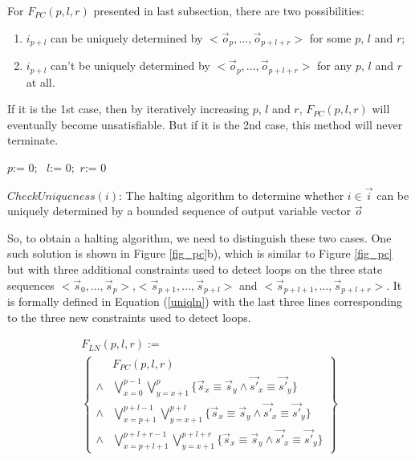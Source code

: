 \documentclass[twocolumn]{article}
\begin{document}
For $F_{PC}(p,l,r)$ presented in last subsection,
there are two possibilities:
\begin{enumerate}
 \item 
$i_{p+l}$ can be uniquely determined by $<\vec{o}_{p},\dots,\vec{o}_{p+l+r}>$ for some $p$, $l$ and $r$;
 \item 
$i_{p+l}$ can't be uniquely determined by $<\vec{o}_{p},\dots,\vec{o}_{p+l+r}>$ for any $p$, $l$ and $r$ at all.
\end{enumerate}

If it is the 1st case,
then by iteratively increasing  $p$, $l$ and $r$,
$F_{PC}(p,l,r)$ will eventually become unsatisfiable.
But if it is the 2nd case,
this method will never terminate.

\begin{algorithm}[t]
\SetAlgoVlined
{}
$p$:= 0; ~$l$:= 0;~$r$:= 0\;
\caption{$CheckUniqueness(i)$: The halting algorithm to determine 
whether $i\in\vec{i}$ can be uniquely determined by a bounded sequence of output variable vector $\vec{o}$}
\label{alg_pcln}
\end{algorithm}

So,
to obtain a halting algorithm,
we need to distinguish these two cases.
One such solution is shown in Figure \ref{fig_pc}b),
which is similar to Figure \ref{fig_pc} but with three additional constraints used to detect loops 
on the three state sequences $<\vec{s}_{0},\dots,\vec{s}_{p}>$,$<\vec{s}_{p+1},\dots,\vec{s}_{p+l}>$ and 
$<\vec{s}_{p+l+1},\dots,\vec{s}_{p+l+r}>$.
It is formally defined in Equation (\ref{uniqln}) with the last three lines corresponding to the three new constraints used to detect loops.

\begin{multline}\label{uniqln}
F_{LN}(p,l,r):=\\
\left\{
\begin{array}{cc}
&F_{PC}(p,l,r)\\
\wedge&\bigvee_{x=0}^{p-1}\bigvee_{y=x+1}^{p} \{\vec{s}_x\equiv \vec{s}_y\wedge \vec{s'}_x\equiv \vec{s'}_y\} \\
\wedge&\bigvee_{x=p+1}^{p+l-1}\bigvee_{y=x+1}^{p+l} \{\vec{s}_x\equiv \vec{s}_y\wedge \vec{s'}_x\equiv \vec{s'}_y\} \\
\wedge&\bigvee_{x=p+l+1}^{p+l+r-1}\bigvee_{y=x+1}^{p+l+r} \{\vec{s}_x\equiv \vec{s}_y\wedge \vec{s'}_x\equiv \vec{s'}_y\}
\end{array}
\right\}
\end{multline}
\end{document}
